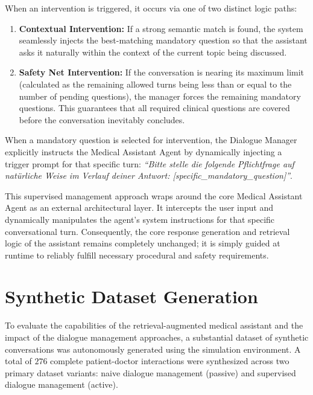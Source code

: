 When an intervention is triggered, it occurs via one of two distinct logic paths:
\begin{enumerate}
    \item \textbf{Contextual Intervention:} If a strong semantic match is found, the system seamlessly injects the best-matching mandatory question so that the assistant asks it naturally within the context of the current topic being discussed.
    \item \textbf{Safety Net Intervention:} If the conversation is nearing its maximum limit (calculated as the remaining allowed turns being less than or equal to the number of pending questions), the manager forces the remaining mandatory questions. This guarantees that all required clinical questions are covered before the conversation inevitably concludes.
\end{enumerate}

When a mandatory question is selected for intervention, the Dialogue Manager explicitly instructs the Medical Assistant Agent by dynamically injecting a trigger prompt for that specific turn: \textit{``Bitte stelle die folgende Pflichtfrage auf natürliche Weise im Verlauf deiner Antwort: [specific\_mandatory\_question]''}.

This supervised management approach wraps around the core Medical Assistant Agent as an external architectural layer. 
It intercepts the user input and dynamically manipulates the agent's system instructions for that specific conversational turn. 
Consequently, the core response generation and retrieval logic of the assistant remains completely unchanged; it is simply guided at runtime to reliably fulfill necessary procedural and safety requirements.

\section{Synthetic Dataset Generation}

To evaluate the capabilities of the retrieval-augmented medical assistant and the impact of the dialogue management approaches, a substantial dataset of synthetic conversations was autonomously generated using the simulation environment. 
A total of $276$ complete patient-doctor interactions were synthesized across two primary dataset variants: naive dialogue management (passive) and supervised dialogue management (active).

